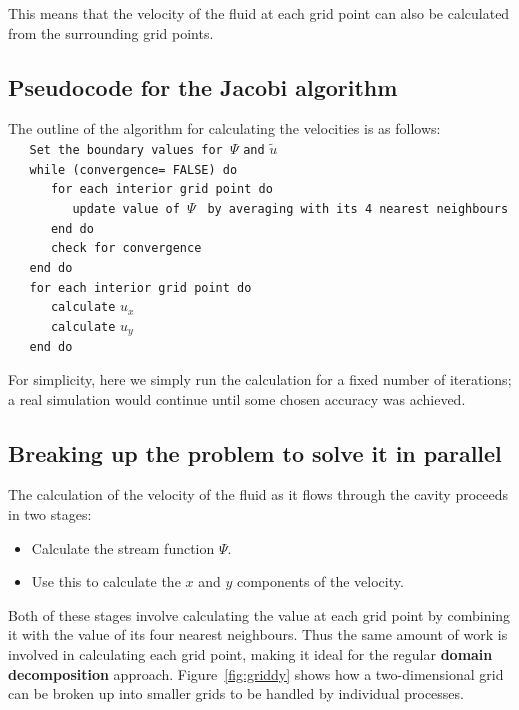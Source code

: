 \documentclass{article}
\begin{document}
This means that the velocity of the fluid at each grid point can also
be calculated from the surrounding grid points.  




\subsection{Pseudocode for the Jacobi algorithm}
The outline of the algorithm for calculating the velocities is as follows: \\

\verb+   Set the boundary values for +$\Psi$ \verb+and+ $\tilde{u}$ \\
\verb+   while (convergence= FALSE) do +\\
\verb+      for each interior grid point do +\\
\verb+         update value of +$\Psi$ \verb+ by averaging with its 4 nearest neighbours +\\
\verb+      end do +\\
\verb+      check for convergence  +\\
\verb+   end do +\\
\verb+   for each interior grid point do +\\
\verb+      calculate+ $u_x$ \\
\verb+      calculate+ $u_y$ \\
\verb+   end do+

For simplicity, here we simply run the calculation for a fixed number
of iterations; a real simulation would continue until some chosen
accuracy was achieved.



\subsection{Breaking up the problem to solve it in parallel}

The calculation of the velocity of the fluid as it flows through the cavity proceeds in two stages: 

\begin{itemize}
\item Calculate the stream function $\Psi$. 
\item Use this to calculate the $x$ and $y$ components of the velocity. 
\end {itemize}

Both of these stages involve calculating the value at each grid point
by combining it with the value of its four nearest neighbours. Thus
the same amount of work is involved in calculating each grid point,
making it ideal for the regular \textbf{domain decomposition}
approach. Figure~\ref{fig:griddy} shows how a two-dimensional grid 
can be broken up into smaller grids to be handled by individual 
processes.
\end{document}
